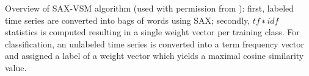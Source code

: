Overview of SAX-VSM algorithm (used with permission from \cite{senin_sax-vsm:_2013}): first, labeled time series are converted into bags of words using SAX; secondly, $tf∗idf$ statistics is computed resulting in a single weight vector per training class. For classification, an unlabeled time series is converted into a term frequency vector and assigned a label of a weight vector which yields a maximal cosine similarity value.
\label{fig:saxvsm_overview}
